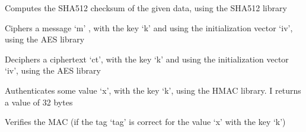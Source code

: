\documentclass[letterpaper,10pt,english]{sphinxmanual}
\begin{document}

\begin{fulllineitems}
\label{restaurants:restaurants.key_exchange.sha512}
Computes the SHA512 checksum of the given data, using the SHA512 library

\end{fulllineitems}


\begin{fulllineitems}
\label{restaurants:restaurants.key_exchange.cipher}
Ciphers a message `m' , with the key `k' and using the initialization vector `iv', using the AES library

\end{fulllineitems}


\begin{fulllineitems}
\label{restaurants:restaurants.key_exchange.decipher}
Deciphers a ciphertext `ct', with the key `k' and using the initialization vector `iv', using the AES library

\end{fulllineitems}


\begin{fulllineitems}
\label{restaurants:restaurants.key_exchange.hmac}
Authenticates some value `x', with the key `k', using the HMAC library. I returns a value of 32 bytes

\end{fulllineitems}


\begin{fulllineitems}
\label{restaurants:restaurants.key_exchange.verifies}
Verifies the MAC (if the tag `tag' is correct for the value `x' with the key `k')

\end{fulllineitems}
\end{document}
